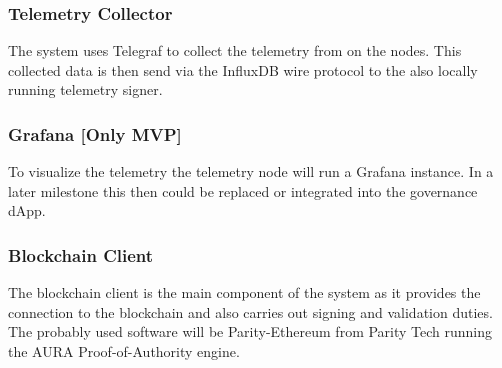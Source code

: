 \subsubsection{Telemetry Collector}

The system uses Telegraf to collect the telemetry from on the nodes. This collected data is then send via the InfluxDB wire protocol to the also locally running telemetry signer.

\subsubsection{Grafana [Only MVP]}

To visualize the telemetry the telemetry node will run a Grafana instance. In a later milestone this then could be replaced or integrated into the governance dApp.

\subsubsection{Blockchain Client}

The blockchain client is the main component of the system as it provides the connection to the blockchain and also carries out signing and validation duties. 
The probably used software will be Parity-Ethereum from Parity Tech running the AURA Proof-of-Authority engine.

